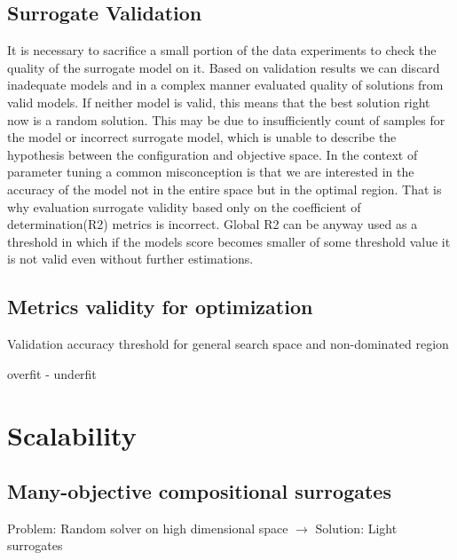         \subsection{Surrogate Validation}
        It is necessary to sacrifice a small portion of the data experiments to check the quality of the surrogate model on it. Based on validation results we can discard inadequate models and in a complex manner evaluated quality of solutions from valid models. If neither model is valid, this means that the best solution right now is a random solution. This may be due to insufficiently count of samples for the model or incorrect surrogate model, which is unable to describe the hypothesis between the configuration and objective space. 
        In the context of parameter tuning a common misconception is that we are interested in the accuracy of the model not in the entire space but in the optimal region. That is why evaluation surrogate validity based only on the coefficient of determination(R2) metrics is incorrect. Global R2 can be anyway used as a threshold in which if the models score becomes smaller of some threshold value it is not valid even without further estimations. 

        \subsection{Metrics validity for optimization}
        Validation accuracy threshold for general search space and non-dominated region

        overfit - underfit
    



    
    \section{Scalability}

        \subsection{Many-objective compositional surrogates}
        Problem: Random solver on high dimensional space $\rightarrow$ Solution: Light surrogates 


